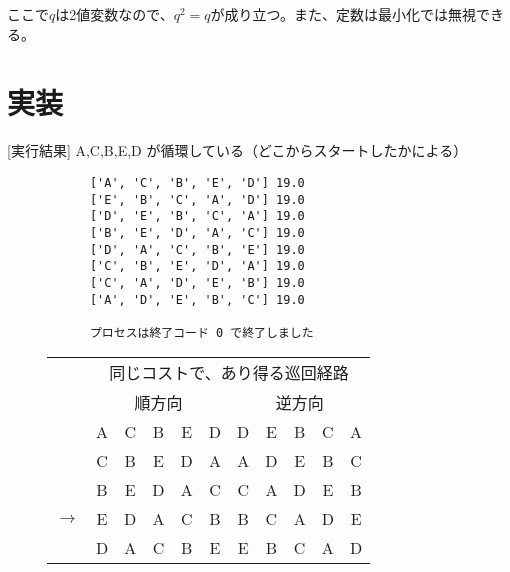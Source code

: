 ここで$q$は2値変数なので、$q^2=q$が成り立つ。また、定数は最小化では無視できる。

\section{実装}




[実行結果] A,C,B,E,D が循環している（どこからスタートしたかによる）

\begin{figure}[h]
  \centering
  \begin{minipage}[c]{0.49\columnwidth}
    \centering
    \begin{verbatim}
      ['A', 'C', 'B', 'E', 'D'] 19.0
      ['E', 'B', 'C', 'A', 'D'] 19.0
      ['D', 'E', 'B', 'C', 'A'] 19.0
      ['B', 'E', 'D', 'A', 'C'] 19.0
      ['D', 'A', 'C', 'B', 'E'] 19.0
      ['C', 'B', 'E', 'D', 'A'] 19.0
      ['C', 'A', 'D', 'E', 'B'] 19.0
      ['A', 'D', 'E', 'B', 'C'] 19.0

      プロセスは終了コード 0 で終了しました
    \end{verbatim}
  \end{minipage}
  \begin{minipage}[c]{0.49\columnwidth}
    \centering
    \begin{tabular}{|c|ccccc|ccccc|}\hline
      \multirow{2}{*}{} & \multicolumn{10}{|c|}{同じコストで、あり得る巡回経路} \\\cline{2-11}
       & \multicolumn{5}{|c|}{順方向} & \multicolumn{5}{|c|}{逆方向} \\\hline
       & A & C & B & E & D & D & E & B & C & A \\
       & C & B & E & D & A & A & D & E & B & C \\
       & B & E & D & A & C & C & A & D & E & B \\
      $\rightarrow$ & E & D & A & C & B & B & C & A & D & E \\
       & D & A & C & B & E & E & B & C & A & D \\\hline
     \end{tabular}

  \end{minipage}
  \end{figure}
